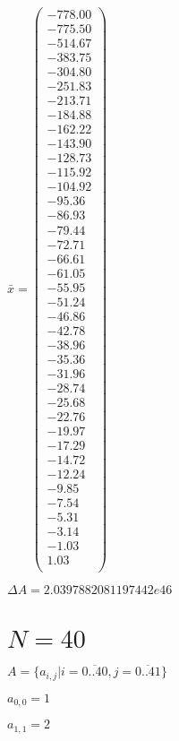 \documentclass[a4paper,12pt]{article}
\begin{document}
$\bar { x } = \begin{pmatrix}
-778.00 \\
-775.50 \\
-514.67 \\
-383.75 \\
-304.80 \\
-251.83 \\
-213.71 \\
-184.88 \\
-162.22 \\
-143.90 \\
-128.73 \\
-115.92 \\
-104.92 \\
-95.36 \\
-86.93 \\
-79.44 \\
-72.71 \\
-66.61 \\
-61.05 \\
-55.95 \\
-51.24 \\
-46.86 \\
-42.78 \\
-38.96 \\
-35.36 \\
-31.96 \\
-28.74 \\
-25.68 \\
-22.76 \\
-19.97 \\
-17.29 \\
-14.72 \\
-12.24 \\
-9.85 \\
-7.54 \\
-5.31 \\
-3.14 \\
-1.03 \\
1.03 \\
\end{pmatrix}
$

$\Delta A = 2.0397882081197442e46$



\section{ $N = 40$ }
$A = \{ a _{ i, j } | i = \overline { 0..40 }, j = \overline { 0..41 } \}$

$a _{ 0, 0 } = 1$

$a _{ 1, 1 } = 2$
\end{document}
